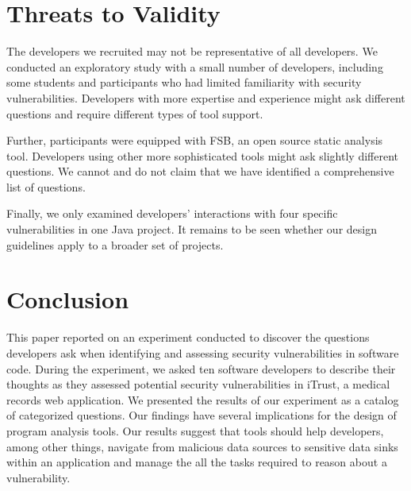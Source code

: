 \documentclass{acm_proc_article-sp}
\begin{document}
\section{Threats to Validity}
\label{limits}
The developers we recruited may not be representative of all developers.
We conducted an exploratory study with a small number of developers, including some students and participants who had limited familiarity with security vulnerabilities.
Developers with more expertise and experience might ask different questions and require different types of tool support.

Further, participants were equipped with FSB, an open source static analysis tool. 
Developers using other more sophisticated tools might ask slightly different questions.
We cannot and do not claim that we have identified a comprehensive list of questions.

Finally, we only examined developers' interactions with four specific vulnerabilities in one Java project. 
It remains to be seen whether our design guidelines apply to a broader set of projects.




\section{Conclusion}
\label{sec:concl}
This paper reported on an experiment conducted to discover the questions developers ask when identifying and assessing security vulnerabilities in software code.
During the experiment, we asked ten software developers to describe their thoughts as they assessed potential security vulnerabilities in iTrust, a medical records web application.
We presented the results of our experiment as a catalog of categorized questions.
Our findings have several implications for the design of program analysis tools. Our results suggest that tools should help developers, among other things, navigate from malicious data sources to sensitive data sinks within an application and 
manage the all the tasks required to reason about a vulnerability.
\end{document}
